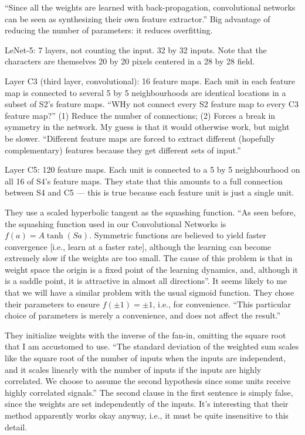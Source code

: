 \documentclass[12pt]{article}
\begin{document}
``Since all the weights are learned with back-propagation,
convolutional networks can be seen as synthesizing their own feature
extractor.''  Big advantage of reducing the number of parameters: it
reduces overfitting.

LeNet-5: 7 layers, not counting the input.  32 by 32 inputs.  Note
that the characters are themselves 20 by 20 pixels centered in a 28 by
28 field.

Layer C3 (third layer, convolutional): 16 feature maps.  Each unit in
each feature map is connected to several 5 by 5 neighbourhoods are
identical locations in a subset of S2's feature maps.  ``WHy not
connect every S2 feature map to every C3 feature map?''  (1) Reduce
the number of connections; (2) Forces a break in symmetry in the
network.  My guess is that it would otherwise work, but might be
slower.  ``Different feature maps are forced to extract different
(hopefully complementary) features because they get different sets of
input.''

Layer C5: 120 feature maps.  Each unit is connected to a 5 by 5
neighbourhood on all 16 of S4's feature maps.  They state that this
amounts to a full connection between S4 and C5 --- this is true
because each feature unit is just a single unit.

They use a scaled hyperbolic tangent as the squashing function.  ``As
seen before, the squashing function used in our Convolutional Networks
is $f(a) = A \tanh(Sa)$.  Symmetric functions are believed to yield
faster convergence [i.e., learn at a faster rate], although the
learning can become extremely slow if the weights are too small.  The
cause of this problem is that in weight space the origin is a fixed
point of the learning dynamics, and, although it is a saddle point, it
is attractive in almost all directions''. It seems likely to me that
we will have a similar problem with the usual sigmoid function.  They
chose their parameters to ensure $f(\pm 1) = \pm 1$, i.e., for
convenience.  ``This particular choice of parameters is merely a
convenience, and does not affect the result.''

They initialize weights with the inverse of the fan-in, omitting the
square root that I am accustomed to use.  ``The standard deviation of
the weighted sum scales like the square root of the number of inputs
when the inputs are independent, and it scales linearly with the
number of inputs if the inputs are highly correlated.  We choose to
assume the second hypothesis since some units receive highly
correlated signals.''  The second clause in the first sentence is
simply false, since the weights are set independently of the inputs.
It's interesting that their method apparently works okay anyway, i.e.,
it must be quite insensitive to this detail.
\end{document}
